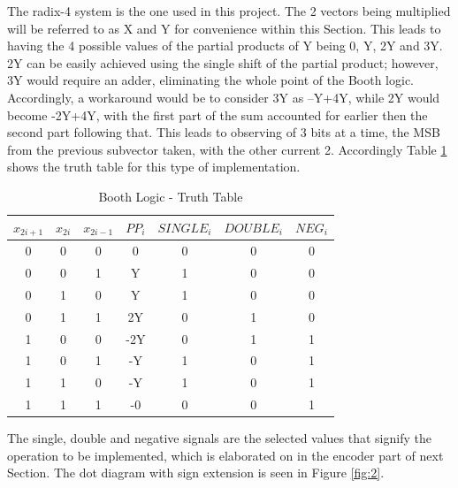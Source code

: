 \documentclass[journal]{IEEEtran}
\begin{document}
The radix-4 system is the one used in this project. The 2 vectors being multiplied will be referred to as X and Y for convenience within this Section. This leads to having the 4 possible values of the partial products of Y being 0, Y, 2Y and 3Y. 2Y can be easily achieved using the single shift of the partial product; however, 3Y would require an adder, eliminating the whole point of the Booth logic. Accordingly, a workaround would be to consider 3Y as –Y+4Y, while 2Y would become -2Y+4Y, with the first part of the sum accounted for earlier then the second part following that. This leads to observing of 3 bits at a time, the MSB from the previous subvector taken, with the other current 2. Accordingly Table \ref{tab:t1} shows the truth table for this type of implementation.

\begin{table}[!h]
\renewcommand{\arraystretch}{1.2}
\caption{Booth Logic - Truth Table}
\label{tab:t1}
\centering
\begin{tabular}{| c | c | c | c | c | c | c |}
\hline
$x_{2i+1}$ & $x_{2i}$  &  $x_{2i-1}$ & $PP_{i}$ & $SINGLE_{i}$ &
$DOUBLE_{i}$ & $NEG_{i}$\\\hline
0 & 0 & 0 & 0 & 0 & 0 & 0\\\hline
0 & 0 & 1 & Y & 1 & 0 & 0\\\hline
0 & 1 & 0 & Y & 1 & 0 & 0\\\hline
0 & 1 & 1 & 2Y & 0 & 1 & 0\\\hline
1 & 0 & 0 & -2Y & 0 & 1 & 1\\\hline
1 & 0 & 1 & -Y & 1 & 0 & 1\\\hline
1 & 1 & 0 & -Y & 1 & 0 & 1\\\hline
1 & 1 & 1 & -0 & 0 & 0 & 1\\\hline
\end{tabular}
\end{table}



The single, double and negative signals are the selected values that signify the operation to be implemented, which is elaborated on in the encoder part of next Section. The dot diagram with sign extension is seen in Figure
\ref{fig:2}.
\end{document}

